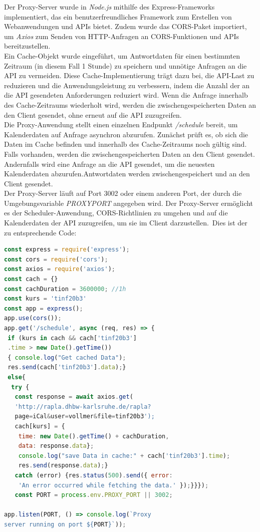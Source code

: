 Der Proxy-Server wurde in \emph{Node.js} mithilfe des Express-Frameworks implementiert, das ein benutzerfreundliches Framework zum Erstellen von Webanwendungen und APIs bietet. Zudem wurde das CORS-Paket importiert, um \emph{Axios} zum Senden von HTTP-Anfragen an CORS-Funktionen und APIs bereitzustellen.\\
Ein Cache-Objekt wurde eingeführt, um  Antwortdaten für einen bestimmten Zeitraum (in diesem Fall 1 Stunde) zu speichern und unnötige Anfragen an die API zu vermeiden. Diese Cache-Implementierung trägt dazu bei, die API-Last zu reduzieren und die Anwendungsleistung zu verbessern, indem  die Anzahl der an die API gesendeten Anforderungen reduziert wird. Wenn die Anfrage innerhalb des Cache-Zeitraums wiederholt wird, werden die zwischengespeicherten Daten an den Client gesendet, ohne erneut auf die API zuzugreifen.\\
Die Proxy-Anwendung stellt einen einzelnen Endpunkt \emph{/schedule} bereit, um Kalenderdaten auf Anfrage asynchron abzurufen. Zunächst prüft es, ob sich die Daten im Cache befinden und innerhalb des Cache-Zeitraums noch  gültig sind. Falls vorhanden, werden die zwischengespeicherten Daten an den Client gesendet. Andernfalls wird eine Anfrage an die API gesendet, um die neuesten Kalenderdaten abzurufen.Antwortdaten werden zwischengespeichert und an den Client gesendet.\\
Der Proxy-Server läuft auf Port 3002 oder einem anderen Port, der durch die Umgebungsvariable \emph{PROXYPORT} angegeben wird. Der Proxy-Server ermöglicht es der Scheduler-Anwendung, CORS-Richtlinien zu umgehen und auf die Kalenderdaten der API zuzugreifen, um sie im Client darzustellen.\
Dies ist der zu entsprechende Code:
\begin{lstlisting}[language=JavaScript,
	frame=single,           % Ein Rahmen um den Code
	framexleftmargin=15pt,  % Rahmen link von den Zahlen
	style=algoBericht,
	label={Proxy-Server},
	captionpos=b ,          % Caption unter den Code setzen
	caption={Proxy-Server}]
const express = require('express');
const cors = require('cors');
const axios = require('axios');
const cach = {}
const cachDuration = 3600000; //1h
const kurs = 'tinf20b3'
const app = express();
app.use(cors());
app.get('/schedule', async (req, res) => {
 if (kurs in cach && cach['tinf20b3']
 .time > new Date().getTime())
 { console.log("Get cached Data");
 res.send(cach['tinf20b3'].data);}
 else{
  try {
   const response = await axios.get(
   'http://rapla.dhbw-karlsruhe.de/rapla?
   page=iCal&user=vollmer&file=tinf20b3');
   cach[kurs] = {
    time: new Date().getTime() + cachDuration,
    data: response.data};
    console.log("save Data in cache:" + cach['tinf20b3'].time);
    res.send(response.data);} 
   catch (error) {res.status(500).send({ error: 
   	'An error occurred while fetching the data.' });}}});
   const PORT = process.env.PROXY_PORT || 3002;

app.listen(PORT, () => console.log(`Proxy 
server running on port ${PORT}`));
	
\end{lstlisting}
